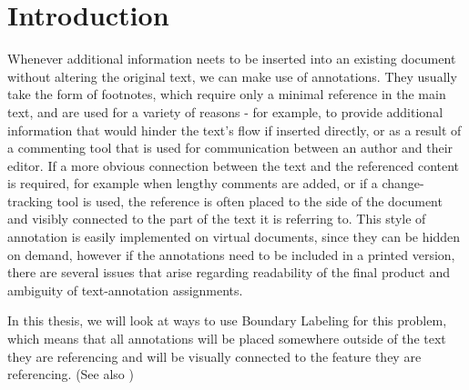 \documentclass[11pt,a4paper]{vutinfth}
\begin{document}
\frontmatter
\addstatementpage






\tableofcontents

\mainmatter



\chapter{Introduction}
Whenever additional information neets to be inserted into an existing document without altering the original text, we can make use of annotations. They usually take the form of footnotes, which require only a minimal reference in the main text, and are used for a variety of reasons - for example, to provide additional information that would hinder the text's flow if inserted directly, or as a result of a commenting tool that is used for communication between an author and their editor.
If a more obvious connection between the text and the referenced content is required, for example when lengthy comments are added, or if a change-tracking tool is used, the reference is often placed to the side of the document and visibly connected to the part of the text it is referring to. This style of annotation is easily implemented on virtual documents, since they can be hidden on demand, however if the annotations need to be included in a printed version, there are several issues that arise regarding readability of the final product and ambiguity of text-annotation assignments.

In this thesis, we will look at ways to use Boundary Labeling for this problem, which means that all annotations will be placed somewhere outside of the text they are referencing and will be visually connected to the feature they are referencing. (See also \cite{Bekos2005}) 
\end{document}
